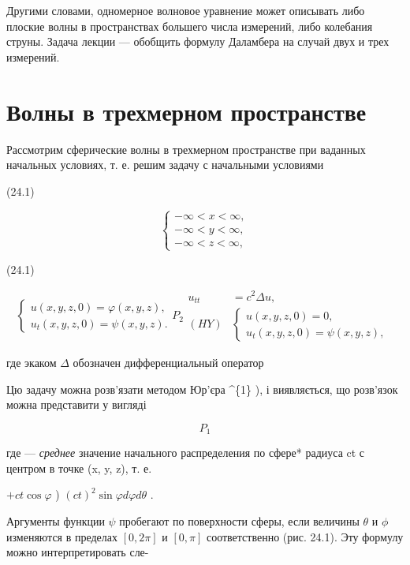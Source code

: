 \documentclass[
  ukrainian,
]{article}
\begin{document}
Другими словами, одномерное волновое уравнение может описывать либо
плоские волны в пространствах большего числа измерений, либо колебания
струны. Задача лекции --- обобщить формулу Даламбера на случай двух и
трех измерений.

\section{Волны в трехмерном
пространстве}\label{ux432ux43eux43bux43dux44b-ux432-ux442ux440ux435ux445ux43cux435ux440ux43dux43eux43c-ux43fux440ux43eux441ux442ux440ux430ux43dux441ux442ux432ux435}

Рассмотрим сферические волны в трехмерном пространстве при ваданных
начальных условиях, т. е. решим задачу с начальными условиями

(24.1)

\[
\begin{cases} -\infty < x < \infty, \\ -\infty < y < \infty, \\ -\infty < z < \infty, \end{cases}
\]

(24.1)

\[
\begin{cases} u(x, y, z, 0) = \varphi(x, y, z), \\ u_{t}(x, y, z, 0) = \psi(x, y, z). \end{cases}
P_{2}
\begin{aligned} u_{tt} &= c^2 \Delta u, \\ (HY) & \begin{cases} u(x, y, z, 0) = 0, \\ u_t(x, y, z, 0) = \psi(x, y, z), \end{cases} \end{aligned}
\]

где экаком \(\Delta\) обозначен дифференциальный оператор

Цю задачу можна розв'язати методом \Phi  Юр'єра \^{}\{1\} ), і
виявляється, що розв'язок можна представити у вигляді

\[
P_{1}
\]

где \overline{\psi} --- \emph{среднее} значение начального распределения
\psi  *по сфере* радиуса ct с центром в точке (x, y, z), т. е.

\(+ ct \cos \varphi\) ) \((ct)^2 \sin \varphi d\varphi d\theta\) .

Аргументы функции \(\psi\) пробегают по поверхности сферы, если величины
\(\theta\) и \(\phi\) изменяются в пределах \([0, 2\pi]\) и \([0, \pi]\)
соответственно (рис. 24.1). Эту формулу можно интерпретировать сле-
\end{document}
